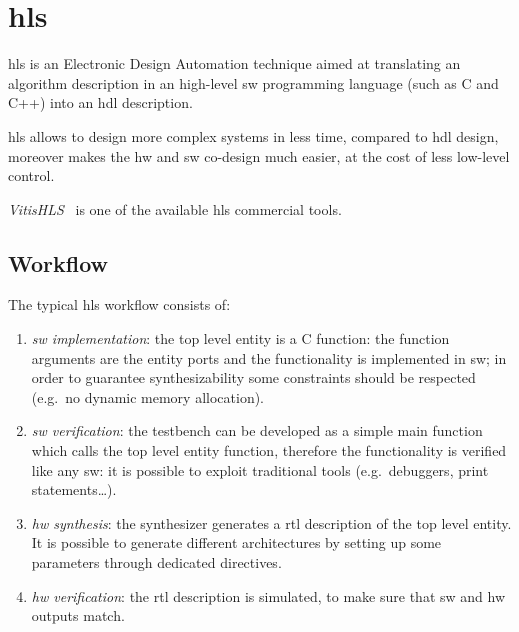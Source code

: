 \documentclass[11pt,a4paper,oneside]{memoir}
\begin{document}
\section{\acl{hls}}
\acf{hls} is an Electronic Design Automation technique aimed at translating an
algorithm description in an high-level \acl{sw} programming language (such as C
and C++) into an \ac{hdl} description.

\ac{hls} allows to design more complex systems in less time, compared to
\ac{hdl} design, moreover makes the \acl{hw} and \acl{sw} co-design much
easier, at the cost of less low-level control.


\emph{Vitis\texttrademark HLS}~\cite{vitisug} is one of the available \ac{hls}
commercial tools.

\subsection{Workflow}
The typical \ac{hls} workflow consists of:
\begin{enumerate}
	\item \emph{\ac{sw} implementation}: the top level entity is a C
		function: the function arguments are the entity ports and the
		functionality is implemented in \ac{sw}; in order to guarantee
		synthesizability some constraints should be respected (e.g.\ no
		dynamic memory allocation).
	\item \emph{\ac{sw} verification}: the testbench can be developed as a
		simple main function which calls the top level entity function,
		therefore the functionality is verified like any \ac{sw}: it is
		possible to exploit traditional tools (e.g.\ debuggers, print
		statements\ldots).
	\item \emph{\ac{hw} synthesis}: the synthesizer generates a \ac{rtl}
		description of the top level entity. It is possible to generate
		different architectures by setting up some parameters through
		dedicated directives.
	\item \emph{\ac{hw} verification}: the \ac{rtl} description is
		simulated, to make sure that \ac{sw} and \ac{hw} outputs match.
\end{enumerate}
\end{document}
